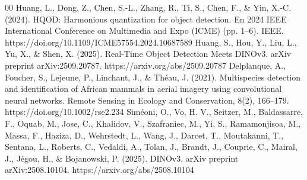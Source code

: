 \documentclass[conference]{IEEEtran}
\begin{document}
\begin{thebibliography}{00}
 Huang, L., Dong, Z., Chen, S.-L., Zhang, R., Ti, S., Chen, F., \& Yin, X.-C. (2024). HQOD: Harmonious quantization for object detection. En 2024 IEEE International Conference on Multimedia and Expo (ICME) (pp. 1–6). IEEE. https://doi.org/10.1109/ICME57554.2024.10687589
 Huang, S., Hou, Y., Liu, L., Yu, X., \& Shen, X. (2025). Real-Time Object Detection Meets DINOv3. arXiv preprint arXiv:2509.20787. https://arxiv.org/abs/2509.20787
 Delplanque, A., Foucher, S., Lejeune, P., Linchant, J., \& Théau, J. (2021). Multispecies detection and identification of African mammals in aerial imagery using convolutional neural networks. Remote Sensing in Ecology and Conservation, 8(2), 166–179. https://doi.org/10.1002/rse2.234
 Siméoni, O., Vo, H. V., Seitzer, M., Baldassarre, F., Oquab, M., Jose, C., Khalidov, V., Szafraniec, M., Yi, S., Ramamonjisoa, M., Massa, F., Haziza, D., Wehrstedt, L., Wang, J., Darcet, T., Moutakanni, T., Sentana, L., Roberts, C., Vedaldi, A., Tolan, J., Brandt, J., Couprie, C., Mairal, J., Jégou, H., \& Bojanowski, P. (2025). DINOv3. arXiv preprint arXiv:2508.10104. https://arxiv.org/abs/2508.10104
\end{thebibliography}



\end{document}

